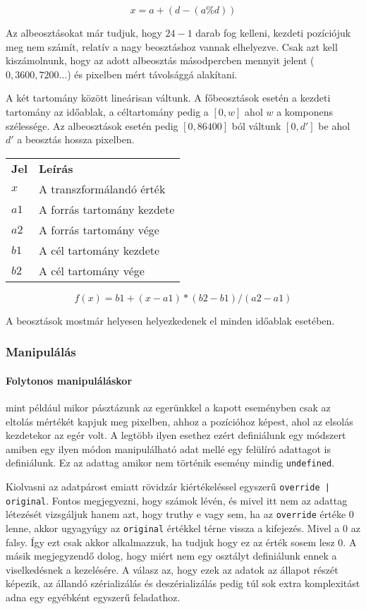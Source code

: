 $$x = a + (d - (a \% d))$$

Az albeosztásokat már tudjuk, hogy $24 - 1$ darab fog kelleni, kezdeti pozíciójuk meg nem számít, relatív a nagy beosztáshoz vannak elhelyezve. Csak azt kell kiszámolnunk, hogy az adott albeosztás másodpercben mennyit jelent ($0, 3600, 7200 \dots $) és pixelben mért távolsággá alakítani.


A két tartomány között lineárisan váltunk. A főbeosztások esetén a kezdeti tartomány az időablak, a céltartomány pedig a $[0, w]$ ahol $w$ a komponens szélessége. Az albeosztások esetén pedig $[0, 86400]$ ból váltunk $[0, d']$ be ahol $d'$ a beosztás hossza pixelben.

\begin{tabular}{@{}ll@{}}
	\textbf{Jel} & \textbf{Leírás} \\
	$x$ & A transzformálandó érték \\
	$a1$ & A forrás tartomány kezdete \\
	$a2$ & A forrás tartomány vége \\
	$b1$ & A cél tartomány kezdete \\
	$b2$ & A cél tartomány vége \\
\end{tabular}

$$ f(x) = b1 + ( x - a1 ) * ( b2 - b1 ) / ( a2 - a1 )$$

A beosztások mostmár helyesen helyezkedenek el minden időablak esetében.

\subsubsection{Manipulálás}

\paragraph{Folytonos manipuláláskor} mint például mikor pásztázunk az egerünkkel a kapott eseményben csak az eltolás mértékét kapjuk meg pixelben, ahhoz a pozícióhoz képest, ahol az elsolás kezdetekor az egér volt. A legtöbb ilyen esethez ezért definiálunk egy módszert amiben egy ilyen módon manipulálható adat mellé egy felülíró adattagot is definiálunk. Ez az adattag amikor nem történik esemény mindig \lstinline[columns=fixed]{undefined}.

Kiolvasni az adatpárost emiatt rövidzár kiértékeléssel egyszerű \lstinline[columns=fixed]{override | original}. Fontos megjegyezni, hogy számok lévén, és mivel itt nem az adattag létezését vizsgáljuk hanem azt, hogy truthy e vagy sem, ha az \lstinline[columns=fixed]{override} értéke $0$ lenne, akkor ugyagyúgy az \lstinline[columns=fixed]{original} értékkel térne vissza a kifejezés. Mivel a $0$ az falsy. Így ezt csak akkor alkalmazzuk, ha tudjuk hogy ez az érték sosem lesz $0$. A másik megjegyzendő dolog, hogy miért nem egy osztályt definiálunk ennek a viselkedésnek a kezelésére. A válasz az, hogy ezek az adatok az állapot részét képezik, az állandó szérializálás és deszérializálás pedig túl sok extra komplexitást adna egy egyébként egyszerű feladathoz.

